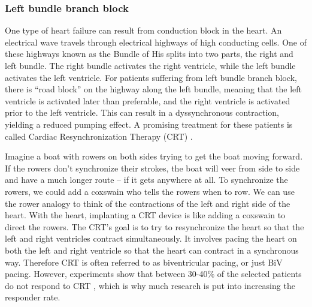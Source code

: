 
\subsubsection{Left bundle branch block}

One type of heart failure can result from conduction block in the
heart. An electrical wave travels through electrical highways
of high conducting cells. One of these highways known as the Bundle of
His splits into two parts, the right and left bundle. The right bundle
activates the right ventricle, while the left bundle activates the
left ventricle. For patients suffering from left bundle branch block,
there is ``road block'' on the highway along the left bundle, meaning
that the left ventricle is activated later than preferable, and the
right ventricle is activated prior to the left
ventricle. This can result in a dyssynchronous contraction, yielding a
reduced pumping effect. A promising treatment for these patients is
called Cardiac Resynchronization Therapy (CRT) \cite{cleland2005effect}.

Imagine a boat with rowers on both sides trying to get the boat moving
forward. If the rowers don’t synchronize their strokes, the boat will
veer from side to side and have a much longer route – if it gets
anywhere at all. To synchronize the rowers, we could add a coxswain
who tells the rowers when to row. We can use the rower analogy to
think of the contractions of the left and right side of the
heart. With the heart, implanting a CRT device is like adding a
coxswain to direct the rowers. The CRT’s goal is to try to
resynchronize the heart so that the left and right ventricles contract
simultaneously. It involves pacing the heart on both the left and
right ventricle so that the heart can contract in a synchronous
way. Therefore CRT is often referred to as biventricular pacing, or
just BiV pacing. However, experiments show that between 30-40\% of the
selected patients do not respond to CRT \cite{daubert20122012}, which
is why much research is put into increasing the responder rate. 





